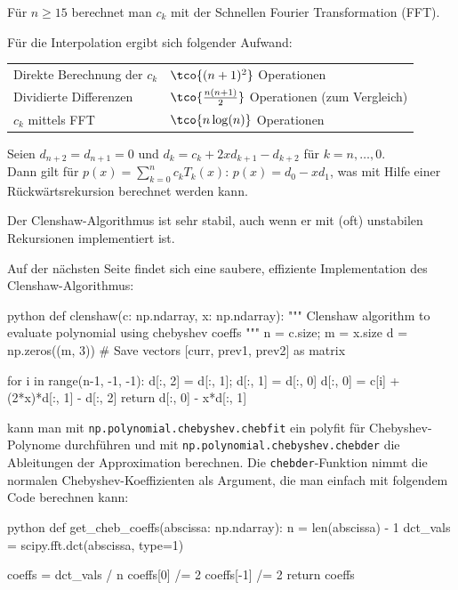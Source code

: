 Für $n \geq 15$ berechnet man $c_k$ mit der Schnellen Fourier Transformation (FFT).

 Für die Interpolation ergibt sich folgender Aufwand:
\begin{center}
	\begin{tabular}{ll}
		Direkte Berechnung der $c_k$ & $\tco{(n + 1)^2}$ Operationen                           \\
		Dividierte Differenzen       & $\tco{\frac{n (n + 1)}{2}}$ Operationen (zum Vergleich) \\
		$c_k$ mittels FFT            & $\tco{n \log(n)}$ Operationen
	\end{tabular}
\end{center}


 Seien $d_{n + 2} = d_{n + 1} = 0$ und $d_k = c_k + 2x d_{k + 1} - d_{k + 2}$ für $k = n, \ldots, 0$.\\
Dann gilt für $p(x) = \sum_{k=0}^n c_kT_k(x)$: $p(x) = d_0 - x d_1$, was mit Hilfe einer Rückwärtsrekursion berechnet werden kann.

Der Clenshaw-Algorithmus ist sehr stabil, auch wenn er mit (oft) unstabilen Rekursionen implementiert ist.

Auf der nächsten Seite findet sich eine saubere, effiziente Implementation des Clenshaw-Algorithmus:

\newpage
\begin{code}{python}
def clenshaw(c: np.ndarray, x: np.ndarray):
    """ Clenshaw algorithm to evaluate polynomial using chebyshev coeffs """
    n = c.size; m = x.size
    d = np.zeros((m, 3))    # Save vectors [curr, prev1, prev2] as matrix
    
    for i in range(n-1, -1, -1):
        d[:, 2] = d[:, 1]; d[:, 1] = d[:, 0]
        d[:, 0] = c[i] + (2*x)*d[:, 1] - d[:, 2]
    return d[:, 0] - x*d[:, 1]
\end{code}


\innumpy kann man mit \texttt{np.polynomial.chebyshev.chebfit} ein polyfit für Chebyshev-Polynome durchführen und mit \texttt{np.polynomial.chebyshev.chebder}
die Ableitungen der Approximation berechnen. Die \texttt{chebder}-Funktion nimmt die normalen Chebyshev-Koeffizienten als Argument, die man einfach mit folgendem Code berechnen kann:
\begin{code}{python}
    def get_cheb_coeffs(abscissa: np.ndarray):
        n = len(abscissa) - 1
        dct_vals = scipy.fft.dct(abscissa, type=1)

        coeffs = dct_vals / n
        coeffs[0] /= 2
        coeffs[-1] /= 2
        return coeffs
\end{code}
